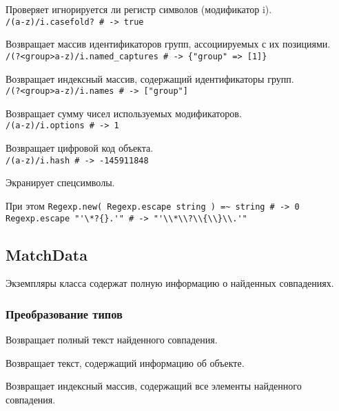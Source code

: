 \begin{methodlist}
  Проверяет игнорируется ли регистр символов (модификатор i).
  \\\verb!/(a-z)/i.casefold? # -> true!

  Возвращает массив идентификаторов групп, ассоциируемых с их позициями.
  \\\verb!/(?<group>a-z)/i.named_captures # -> {"group" => [1]}!

  Возвращает индексный массив, содержащий идентификаторы групп.
  \\\verb!/(?<group>a-z)/i.names # -> ["group"]!

  Возвращает сумму чисел используемых модификаторов.
  \\\verb!/(a-z)/i.options # -> 1!

  Возвращает цифровой код объекта.  
  \\\verb!/(a-z)/i.hash # -> -145911848!

  Экранирует спецсимволы. 
  
  При этом \verb!Regexp.new( Regexp.escape string ) =~ string # -> 0!
  \\\verb!Regexp.escape "'\*?{}.'" # -> "'\\*\\?\\{\\}\\.'"!
\end{methodlist}

\subsection{MatchData}
 
Экземпляры класса содержат полную информацию о найденных совпадениях.

\subsubsection*{Преобразование типов}

\begin{methodlist}
  Возвращает полный текст найденного совпадения.

  Возвращает текст, содержащий информацию об объекте.

  Возвращает индексный массив, содержащий все элементы найденного совпадения.
\end{methodlist}

